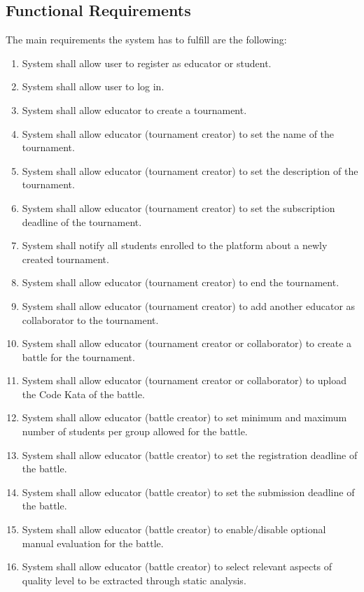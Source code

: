 \subsection{Functional Requirements}
The main requirements the system has to fulfill are the following:
\begin{enumerate}[label=$\bullet$ \textbf{R\arabic*:}]
    \item System shall allow user to register as educator or student.
    \item System shall allow user to log in.
    \item System shall allow educator to create a tournament.
    \item System shall allow educator (tournament creator) to set the name of the tournament.
    \item System shall allow educator (tournament creator) to set the description of the tournament.
    \item System shall allow educator (tournament creator) to set the subscription deadline of the tournament.
    \item System shall notify all students enrolled to the platform about a newly created tournament.
    \item System shall allow educator (tournament creator) to end the tournament.
    \item System shall allow educator (tournament creator) to add another educator as collaborator to the tournament.
    \item System shall allow educator (tournament creator or collaborator) to create a battle for the tournament.
    \item System shall allow educator (tournament creator or collaborator) to upload the Code Kata of the battle.
    \item System shall allow educator (battle creator) to set minimum and maximum number of students per group allowed for the battle.
    \item System shall allow educator (battle creator) to set the registration deadline of the battle.
    \item System shall allow educator (battle creator) to set the submission deadline of the battle.
    \item System shall allow educator (battle creator) to enable/disable optional manual evaluation for the battle.
    \item System shall allow educator (battle creator) to select relevant aspects of quality level to be extracted through static analysis.

\end{enumerate}
